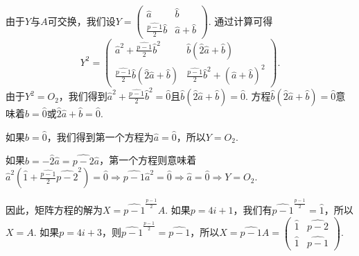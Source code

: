 \begin{solution}
\begin{inparaenum}[(a)]
      由于$Y$与$A$可交换，我们设$Y=\begin{pmatrix}
        \hat a & \hat b \\
        \frac{\widehat{p-1}}2\hat b & \hat a + \hat b
      \end{pmatrix}$. 通过计算可得
      \[
        Y^2 = \begin{pmatrix}
          \hat a^2 + \frac{\widehat{p-1}}2 \hat b^2 & \hat b \left( \hat2\hat a + \hat b \right) \\
          \frac{\widehat{p-1}}2\hat b \left( \hat2\hat a + \hat b\right) & \frac{\widehat{p-1}}2\hat b^2 + (\hat a + \hat b)^2
        \end{pmatrix}.
      \]
      由于$Y^2=O_2$，我们得到$\hat a^2 + \frac{\widehat{p-1}}2 \hat b^2=\hat 0$且$\hat b \left( \hat2\hat a + \hat b \right)=\hat 0$. 方程$\hat b \left( \hat2\hat a + \hat b \right)=\hat0$意味着$\hat b=\hat 0$或$\hat2\hat a+\hat b = \hat 0$.

      如果$\hat b= \hat 0$，我们得到第一个方程为$\hat a= \hat0$，所以$Y=O_2$.

      如果$\hat b =-\hat2\hat a=\widehat{p-2}\hat a$，第一个方程则意味着$\hat a^2\left(
      \hat1 + \frac{\widehat{p-1}}2\widehat{p-2}^2\right)
      =\hat0\Rightarrow\widehat{p-1}\hat a^2=\hat 0 \Rightarrow \hat a =\hat0\Rightarrow Y=O_2$.

      因此，矩阵方程的解为$X=\widehat{p-1}^{\frac{p-1}2}A$. 如果$p=4i+1$，我们有$\widehat{p-1}^{\frac{p-1}2}=\hat1$，所以$X=A$. 如果$p=4i+3$，则$\widehat{p-1}^{\frac{p-1}2}=\widehat{p-1}$，所以$X=
      \widehat{p-1}A=\begin{pmatrix}
        \hat 1 & \widehat{p-2} \\
        \hat 1 & \widehat{p-1}
      \end{pmatrix}$.
    \end{inparaenum}
\end{solution}


